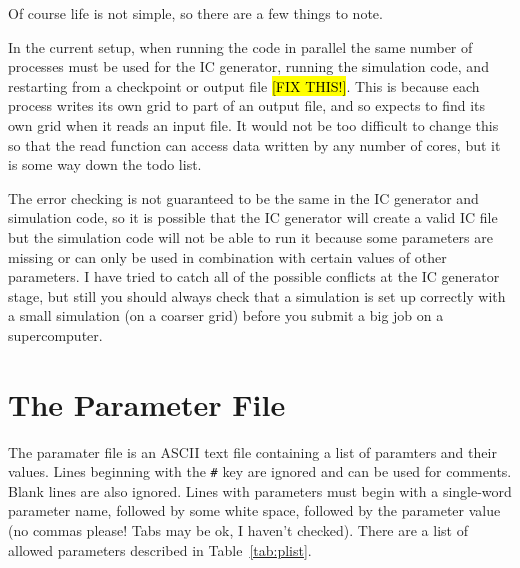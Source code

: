 \documentclass[a4paper,11pt]{report}
\begin{document}
Of course life is not simple, so there are a few things to note.

In the current setup, when running the code in parallel the same number of processes must be used for the IC generator, running the simulation code, and restarting from a checkpoint or output file \hl{[FIX THIS!]}.
This is because each process writes its own grid to part of an output file, and so expects to find its own grid when it reads an input file.
It would not be too difficult to change this so that the read function can access data written by any number of cores, but it is some way down the todo list.

The error checking is not guaranteed to be the same in the IC generator and simulation code, so it is possible that the IC generator will create a valid IC file but the simulation code will not be able to run it because some parameters are missing or can only be used in combination with certain values of other parameters.
I have tried to catch all of the possible conflicts at the IC generator stage, but still you should always check that a simulation is set up correctly with a small simulation (on a coarser grid) before you submit a big job on a supercomputer.


\section{The Parameter File}
The paramater file is an ASCII text file containing a list of paramters and their values.
Lines beginning with the \verb|#| key are ignored and can be used for comments.
Blank lines are also ignored.
Lines with parameters must begin with a single-word parameter name, followed by some white space, followed by the parameter value (no commas please! Tabs may be ok, I haven't checked).
There are a list of allowed parameters described in Table~\ref{tab:plist}.
\end{document}
